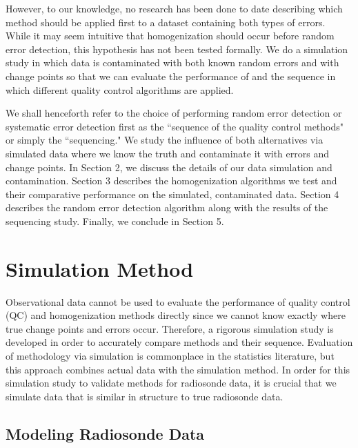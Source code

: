 \documentclass[12pt]{article}
\begin{document}
\begin{doublespacing}
However, to our knowledge, no research has been done to date describing which method should be applied first to a dataset containing both types of errors.  While it may seem intuitive that homogenization should occur before random error detection, this hypothesis has not been tested formally.  We do a simulation study in which data is contaminated with both known random errors and with change points so that we can  evaluate the performance of and the sequence in which  different quality control algorithms are applied.

We shall henceforth refer to the choice of performing random error detection or systematic error detection first  as the ``sequence of the quality control methods" or simply the ``sequencing."  We study the influence of both alternatives via simulated data where we  know the  truth and contaminate it with errors and change points.  In Section 2, we discuss the details of our data simulation and contamination.  Section 3 describes the homogenization algorithms we test and their comparative performance on the simulated, contaminated data.  Section 4 describes the random error detection algorithm along with the results of the sequencing study.  Finally, we conclude in Section 5.

\section{Simulation Method}
Observational data cannot be used to evaluate the performance of quality control (QC) and homogenization methods directly since we cannot know exactly where true change points and errors occur.  Therefore, a rigorous simulation study is developed in order to accurately compare methods and their sequence.  Evaluation of methodology via simulation is commonplace in the statistics literature, but this approach combines actual data with the simulation method.  In order for this simulation study to validate methods for radiosonde data, it is crucial that we simulate data that is similar in structure to true radiosonde data.









\subsection{Modeling Radiosonde Data}


\end{doublespacing}
\end{document}
